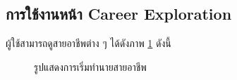 \subsection{การใช้งานหน้า Career Exploration}
ผู้ใช้สามารถดูสายอาชีพต่าง ๆ ได้ดังภาพ \ref{fig:home-CE} ดังนี้
\begin{figure}[H]\centering
    \caption{รูปแสดงการเริ่มทำนายสายอาชีพ}\label{fig:home-CE}
\end{figure}